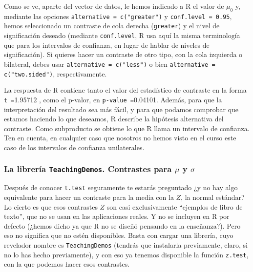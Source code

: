 \documentclass[10pt,a4paper]{article}\usepackage[]{graphicx}\usepackage[]{color}
\newcounter {cont01}
\begin{document}
Como se ve, aparte del vector de datos, le hemos indicado a R el valor de $\mu_0$ y, mediante las
opciones  {\tt alternative = c("greater")} y {\tt conf.level = 0.95}, hemos seleccionado un contraste de cola derecha ({\tt greater}) y el nivel de significación deseado (mediante {\tt conf.level}, R usa aquí la misma terminología que para los intervalos de confianza, en lugar de hablar de niveles de significación).  Si quieres hacer un contraste de otro tipo, con la cola izquierda o bilateral, debes usar {\tt alternative = c("less")} o bien {\tt alternative = c("two.sided")}, respectivamente.

La respuesta de R contiene tanto el valor del estadístico de contraste en la forma {\tt t =}1.95712 , como el p-valor, en {\tt p-value =}0.04101. Además, para que la interpretación del resultado sea más fácil, y para que podamos comprobar que estamos haciendo lo que deseamos, R describe la hipótesis alternativa del contraste. Como subproducto se obtiene lo que R llama un intervalo de confianza. Ten en cuenta, en cualquier caso que nosotros no hemos visto en el curso este caso de los intervalos de confianza unilaterales.

\subsubsection{La librería {\tt TeachingDemos}. Contrastes para $\mu$ y $\sigma$}
\label{tut07:subsubsec:TeachingDemos}

Después de conocer {\tt t.test} seguramente te estarás preguntado ¿y no hay algo equivalente para hacer un contraste para la media con la $Z$, la normal estándar?  Lo cierto es que esos contrastes $Z$ son casi exclusivamente ``ejemplos de libro de texto'', que no se usan en las aplicaciones reales. Y no se incluyen en R por defecto (¿hemos dicho ya que R no se diseñó pensando en la enseñanza?). Pero eso no significa que no estén disponibles. Basta con cargar una librería, cuyo revelador nombre es {\tt TeachingDemos} (tendrás que instalarla previamente, claro, si no lo  has hecho previamente), y con eso ya tenemos disponible la función {\tt z.test}, con la que podemos hacer esos contrastes.
\end{document}
